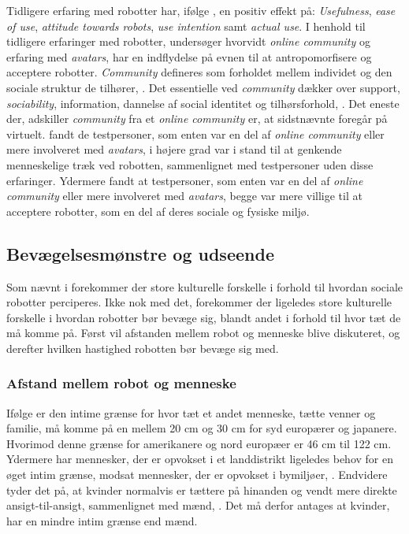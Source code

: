 Tidligere erfaring med robotter har, ifølge \textcite[s. 1479]{PDF:ExploringInfluencingVariable}, en positiv effekt på: \textit{Usefulness}, \textit{ease of use}, \textit{attitude towards robots}, \textit{use intention} samt \textit{actual use}. I henhold til tidligere erfaringer med robotter, undersøger \textcite{PDF:CloseButNotStuck} hvorvidt \textit{online community} og erfaring med \textit{avatars}, har en indflydelse på evnen til at antropomorfisere og acceptere robotter. \textit{Community} defineres som forholdet mellem individet og den sociale struktur de tilhører, \parencite[ss. 20-21]{PDF:CloseButNotStuck}. Det essentielle ved \textit{community} dækker over support, \textit{sociability}, information, dannelse af social identitet og tilhørsforhold, \parencite[s. 21]{PDF:CloseButNotStuck}. Det eneste der, adskiller \textit{community} fra et \textit{online community} er, at sidstnævnte foregår på virtuelt. \textcite[s. 25]{PDF:CloseButNotStuck} fandt de testpersoner, som enten var en del af \textit{online community} eller mere involveret med \textit{avatars}, i højere grad var i stand til at genkende menneskelige træk ved robotten, sammenlignet med testpersoner uden disse erfaringer. Ydermere fandt \textcite[s. 26]{PDF:CloseButNotStuck} at testpersoner, som enten var en del af \textit{online community} eller mere involveret med \textit{avatars}, begge var mere villige til at acceptere robotter, som en del af deres sociale og fysiske miljø.  
%

\subsection{Bevægelsesmønstre og udseende}
\label{InteraktionSocialeRobotterParametreBevaegelsesmoenstre}
%
Som nævnt i  forekommer der store kulturelle forskelle i forhold til hvordan sociale robotter perciperes. Ikke nok med det, forekommer der ligeledes store kulturelle forskelle i hvordan robotter bør bevæge sig, blandt andet i forhold til hvor tæt de må komme på. Først vil afstanden mellem robot og menneske blive diskuteret, og derefter hvilken hastighed robotten bør bevæge sig med. 

\subsubsection*{Afstand mellem robot og menneske}
\label{InteraktionSocialeRobotterParametreBevaegelsesmoenstreAfstand}
%
Ifølge \textcite[s. 178]{PDF:HowMayIServeYou} er den intime grænse for hvor tæt et andet menneske, tætte venner og familie, må komme på en mellem 20 cm og 30 cm for syd europærer og japanere. Hvorimod denne grænse for amerikanere og nord europæer er 46 cm til 122 cm. Ydermere har mennesker, der er opvokset i et landdistrikt ligeledes behov for en øget intim grænse, modsat mennesker, der er opvokset i bymiljøer, \textcite[s. 178]{PDF:HowMayIServeYou}. Endvidere tyder det på, at kvinder normalvis er tættere på hinanden og vendt mere direkte ansigt-til-ansigt, sammenlignet med mænd, \parencite[s. 178]{PDF:HowMayIServeYou}. Det må derfor antages at kvinder, har en mindre intim grænse end mænd.

